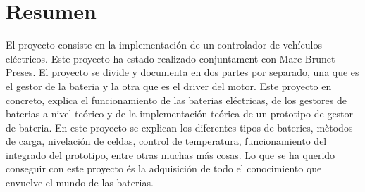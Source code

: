 \chapter{Resumen}
\label{chap:Resumen}

El proyecto consiste en la implementación de un controlador de vehículos eléctricos. Este proyecto ha estado realizado conjuntament con Marc Brunet Preses. El proyecto se divide y documenta en dos partes por separado, una que es el gestor de la bateria y la otra que es el driver del motor. Este proyecto en concreto, explica el funcionamiento de las baterias eléctricas, de los gestores de baterias a nivel teórico y de la implementación teórica de un prototipo de gestor de bateria. En este proyecto se explican los diferentes tipos de bateries, mètodos de carga, nivelación de celdas, control de temperatura, funcionamiento del integrado del prototipo, entre otras muchas más cosas. Lo que se ha querido conseguir con este proyecto és la adquisición de todo el conocimiento que envuelve el mundo de las baterias.
\newpage